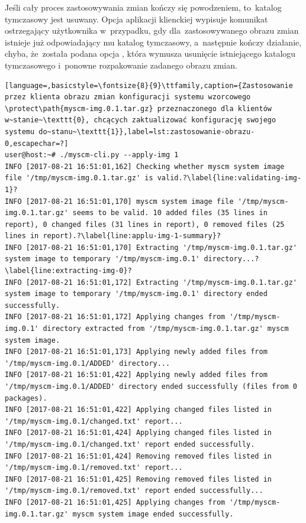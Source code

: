 \documentclass[thesis]{subfiles}
\begin{document}
Jeśli cały proces zastosowywania zmian kończy się powodzeniem, to~katalog tymczasowy jest usuwany. Opcja  aplikacji klienckiej wypisuje komunikat ostrzegający użytkownika w~przypadku, gdy dla~zastosowywanego obrazu zmian istnieje już odpowiadający mu katalog tymczasowy, a~następnie kończy działanie, chyba, że~została podana opcja , która wymusza usunięcie istniejącego katalogu tymczasowego i~ponowne rozpakowanie zadanego obrazu zmian.

\begin{lstlisting}[language=,basicstyle=\fontsize{8}{9}\ttfamily,caption={Zastosowanie przez klienta obrazu zmian konfiguracji systemu wzorcowego \protect\path{myscm-img.0.1.tar.gz} przeznaczonego dla klientów w~stanie~\texttt{0}, chcących zaktualizować konfigurację swojego systemu do~stanu~\texttt{1}},label=lst:zastosowanie-obrazu-0,escapechar=?]
user@host:~# ./myscm-cli.py --apply-img 1
INFO [2017-08-21 16:51:01,162] Checking whether myscm system image file '/tmp/myscm-img.0.1.tar.gz' is valid.?\label{line:validating-img-1}?
INFO [2017-08-21 16:51:01,170] myscm system image file '/tmp/myscm-img.0.1.tar.gz' seems to be valid. 10 added files (35 lines in report), 0 changed files (31 lines in report), 0 removed files (25 lines in report).?\label{line:applu-img-1-summary}?
INFO [2017-08-21 16:51:01,170] Extracting '/tmp/myscm-img.0.1.tar.gz' system image to temporary '/tmp/myscm-img.0.1' directory...?\label{line:extracting-img-0}?
INFO [2017-08-21 16:51:01,172] Extracting '/tmp/myscm-img.0.1.tar.gz' system image to temporary '/tmp/myscm-img.0.1' directory ended successfully.
INFO [2017-08-21 16:51:01,172] Applying changes from '/tmp/myscm-img.0.1' directory extracted from '/tmp/myscm-img.0.1.tar.gz' myscm system image.
INFO [2017-08-21 16:51:01,173] Applying newly added files from '/tmp/myscm-img.0.1/ADDED' directory...
INFO [2017-08-21 16:51:01,422] Applying newly added files from '/tmp/myscm-img.0.1/ADDED' directory ended successfully (files from 0 packages).
INFO [2017-08-21 16:51:01,422] Applying changed files listed in '/tmp/myscm-img.0.1/changed.txt' report...
INFO [2017-08-21 16:51:01,424] Applying changed files listed in '/tmp/myscm-img.0.1/changed.txt' report ended successfully.
INFO [2017-08-21 16:51:01,424] Removing removed files listed in '/tmp/myscm-img.0.1/removed.txt' report...
INFO [2017-08-21 16:51:01,425] Removing removed files listed in '/tmp/myscm-img.0.1/removed.txt' report ended successfully...
INFO [2017-08-21 16:51:01,425] Applying changes from '/tmp/myscm-img.0.1.tar.gz' myscm system image ended successfully.
\end{lstlisting}
\end{document}
